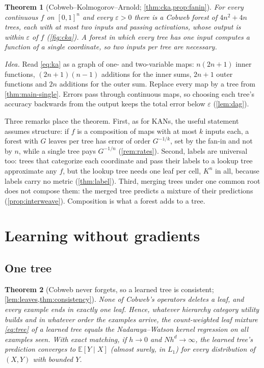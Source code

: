 \documentclass[11pt]{article}
\newtheorem{theorem}{Theorem}
\theoremstyle{definition}
\theoremstyle{remark}
\newcommand{\E}{\mathbb{E}}
\begin{document}
\begin{theorem}[Cobweb--Kolmogorov--Arnold; \cref{thm:cka,prop:fanin}]\label{thm:main-cka}
For every continuous $f$ on $[0,1]^n$ and every $\varepsilon>0$ there is a Cobweb forest
of $4n^2+4n$ trees, each with at most two inputs and passing activations, whose output
is within $\varepsilon$ of $f$ (\cref{fig:cka}).  A forest in which every tree has one
input computes a function of a single coordinate, so two inputs per tree are necessary.
\end{theorem}

\emph{Idea.}  Read \eqref{eq:ka} as a graph of one- and two-variable maps:
$n(2n+1)$ inner functions, $(2n+1)(n-1)$ additions for the inner sums, $2n+1$ outer
functions and $2n$ additions for the outer sum.  Replace every map by a tree from
\cref{thm:main-single}.  Errors pass through continuous maps, so choosing each tree's
accuracy backwards from the output keeps the total error below $\varepsilon$
(\cref{lem:dag}).

Three remarks place the theorem.  First, as for KANs, the useful statement assumes
structure: if $f$ is a composition of maps with at most $k$ inputs each, a forest with
$G$ leaves per tree has error of order $G^{-1/k}$, set by the fan-in and not by $n$,
while a single tree pays $G^{-1/n}$ (\cref{rem:rates}).  Second, labels are universal
too: trees that categorize each coordinate and pass their labels to a lookup tree
approximate any $f$, but the lookup tree needs one leaf per cell, $K^n$ in all, because
labels carry no metric (\cref{thm:label}).  Third, merging trees under one common root
does not compose them: the merged tree predicts a mixture of their predictions
(\cref{prop:interweave}).  Composition is what a forest adds to a tree.

\section{Learning without gradients}\label{sec:learn-main}

\subsection{One tree}

\begin{theorem}[Cobweb never forgets, so a learned tree is consistent;
\cref{lem:leaves,thm:consistency}]\label{thm:main-learn}
None of Cobweb's operators deletes a leaf, and every example ends in exactly one leaf.
Hence, whatever hierarchy category utility builds and in whatever order the examples
arrive, the count-weighted leaf mixture \eqref{eq:tree} of a learned tree equals the
Nadaraya--Watson kernel regression on all examples seen.  With exact matching, if
$h\to0$ and $Nh^d\to\infty$, the learned tree's prediction converges to $\E[Y\mid X]$
(almost surely, in $L_1$) for every distribution of $(X,Y)$ with bounded $Y$.
\end{theorem}
\end{document}
